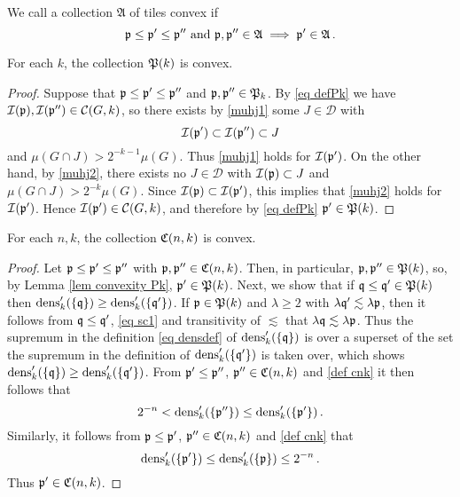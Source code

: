 We call a collection $\mathfrak{A}$ of tiles convex if
\begin{equation}
    \label{eq convexity}
    \mathfrak p \le \mathfrak p' \le \mathfrak p'' \ \text{and} \ \mathfrak p, \mathfrak p'' \in \mathfrak{A} \implies \mathfrak p' \in \mathfrak{A}\,.
\end{equation}

\begin{lemma}
    \label{lem convexity Pk}
    For each $k$, the collection $\mathfrak P(k)$ is convex.
\end{lemma}

\begin{proof}
    Suppose that $\mathfrak p \le \mathfrak p' \le \mathfrak p''$ and $\mathfrak p, \mathfrak p'' \in \mathfrak P_k$. By \eqref{eq defPk} we have $\mathcal{I}(\mathfrak p), \mathcal{I}(\mathfrak p'') \in \mathcal{C}(G,k)$, so there exists by \eqref{muhj1} some $J \in \mathcal{D}$ with
    $$
        \mathcal{I}(\mathfrak p') \subset \mathcal{I}(\mathfrak p'') \subset J
    $$
    and $\mu(G \cap J) > 2^{-k-1} \mu(G)$. Thus \eqref{muhj1} holds for $\mathcal{I}(\mathfrak p')$. On the other hand, by \eqref{muhj2}, there exists no $J \in \mathcal{D}$ with $\mathcal{I}(\mathfrak p) \subset J$ and $\mu(G \cap J) > 2^{-k} \mu(G)$. Since $\mathcal{I}(\mathfrak p) \subset \mathcal{I}(\mathfrak p')$, this implies that \eqref{muhj2} holds for $\mathcal{I}(\mathfrak p')$. Hence $\mathcal{I}(\mathfrak p') \in \mathcal{C}(G,k)$, and therefore by \eqref{eq defPk} $\mathfrak p' \in \mathfrak P(k)$.
\end{proof}

\begin{lemma}
    \label{lem convexity Cnk}
    For each $n,k$, the collection $\mathfrak C(n,k)$ is convex.
\end{lemma}

\begin{proof}
    Let $\mathfrak p \le \mathfrak p' \le \mathfrak p''$ with $\mathfrak p, \mathfrak p'' \in \mathfrak C(n,k)$. Then, in particular, $\mathfrak p, \mathfrak p'' \in \mathfrak P(k)$, so, by Lemma \ref{lem convexity Pk}, $\mathfrak p' \in \mathfrak P(k)$. Next, we show that if $\mathfrak q \le \mathfrak q' \in \mathfrak P(k)$ then $\operatorname{\operatorname{dens}}'_k(\{\mathfrak q\}) \ge \operatorname{\operatorname{dens}}_k'(\{\mathfrak q'\})$. If $\mathfrak p \in \mathfrak P(k)$ and $\lambda \ge 2$ with $\lambda \mathfrak q' \lesssim \lambda \mathfrak p$, then it follows from $\mathfrak q \le \mathfrak q'$, \eqref{eq sc1} and transitivity of $\lesssim$ that $\lambda \mathfrak q \lesssim \lambda \mathfrak p$. Thus the supremum in the definition \eqref{eq densdef} of $\operatorname{\operatorname{dens}}_k'(\{\mathfrak q\})$ is over a superset of the set the  supremum in the definition of $\operatorname{\operatorname{dens}}_k'(\{\mathfrak q'\})$ is taken over, which shows $\operatorname{\operatorname{dens}}'_k(\{\mathfrak q\}) \ge \operatorname{\operatorname{dens}}_k'(\{\mathfrak q'\})$. From $\mathfrak p' \le \mathfrak p''$, $\mathfrak p'' \in \mathfrak C(n,k)$ and \eqref{def cnk} it then follows that
    $$
        2^{-n} < \operatorname{\operatorname{dens}}_k'(\{\mathfrak p''\}) \le \operatorname{\operatorname{dens}}_k'(\{\mathfrak p'\})\,.
    $$
    Similarly, it follows from $\mathfrak p \le \mathfrak p'$, $\mathfrak p'' \in \mathfrak C(n,k)$ and \eqref{def cnk} that
    $$
        \operatorname{\operatorname{dens}}_k'(\{\mathfrak p'\}) \le \operatorname{\operatorname{dens}}_k'(\{\mathfrak p\}) \le 2^{-n}\,.
    $$
    Thus $\mathfrak p' \in \mathfrak C(n,k)$.
\end{proof}

